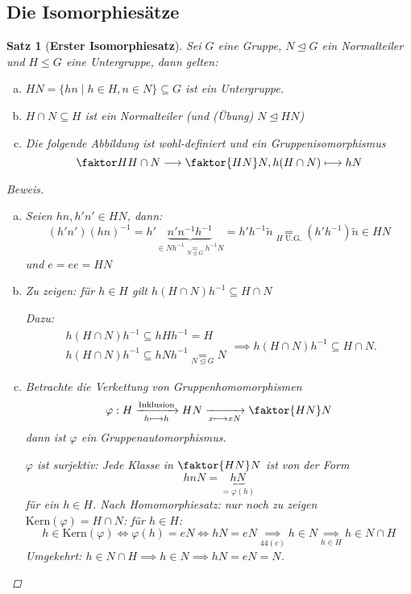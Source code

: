 \documentclass[a4paper]{report}
\theoremstyle{plain}
\newtheorem{satz}[thm]{Satz}
\theoremstyle{definition}
\begin{document}
\subsection*{Die Isomorphiesätze}
\begin{satz}[\textbf{Erster Isomorphiesatz}]
  Sei $G$ eine Gruppe, $N \trianglelefteq G$ ein Normalteiler und $H \le G$ eine Untergruppe, dann gelten:
  \begin{enumerate}[(a)]
    \item $HN = \{hn \mid h \in H, n \in N\} \subseteq G$ ist ein Untergruppe.
    \item $H \cap N \subseteq H$ ist ein Normalteiler (und (Übung) $N \trianglelefteq HN$)
    \item Die folgende Abbildung ist wohl-definiert und ein Gruppenisomorphismus $$\faktor H{H \cap N} \longrightarrow \faktor {HN}N, h(H\cap N) \longmapsto hN$$
  \end{enumerate}
\begin{proof}[Beweis]
\begin{enumerate}[(a)]
  \item Seien $hn, h'n' \in HN$, dann:
        $$(h'n')(hn)^{-1}=h'\underbrace{n'n^{-1}h^{-1}}_{\in Nh^{-1} \underset{N \trianglelefteq G} = h^{-1}N} = h'h^{-1}\tilde n \underset{H \text{ U.G.}}= (h'h^{-1})\tilde n \in HN$$
        und $e = ee = HN$
  \item Zu zeigen: für $h \in H$ gilt $h(H \cap N)h^{-1} \subseteq H \cap N$

        Dazu:
        $$\begin{matrix}
            h (H \cap N)h^{-1} \subseteq hHh^{-1} = H \\
            h (H \cap N)h^{-1} \subseteq hNh^{-1} \underset{N \trianglelefteq G}= N
          \end{matrix} \implies h(H \cap N)h^{-1} \subseteq H \cap N.$$

  \item Betrachte die Verkettung von Gruppenhomomorphismen
        $$\varphi: H \xrightarrow[h \longmapsto h]{\text{Inklusion}} HN \xrightarrow[x \longmapsto xN]{} \faktor{HN}N$$
        dann ist $\varphi$ ein Gruppenautomorphismus.

        $\varphi$ ist surjektiv: Jede Klasse in $\faktor{HN}N$ ist von der Form $$hnN = \underbrace{hN}_{=\varphi(h)}$$
        für ein $h \in H$. Nach Homomorphiesatz: nur noch zu zeigen $\mathrm{Kern}(\varphi) = H \cap N$:
        für $h \in H$: $$h \in \mathrm{Kern}(\varphi) \iff \varphi(h) = eN \iff hN = eN \underset{44(c)}\implies h \in N \underset{h \in H}\implies h \in N \cap H$$
        Umgekehrt: $h \in N \cap H \implies h \in N \implies hN = eN = N$.
\end{enumerate}
\end{proof}
\end{satz}
\end{document}
